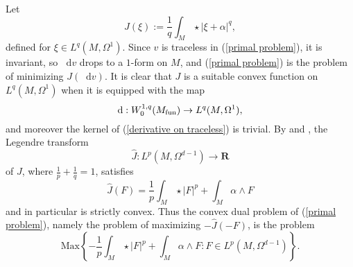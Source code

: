 \documentclass[reqno,11pt]{amsart}
\newcommand{\RR}{\mathbf{R}}
\newcommand*\dif{\mathop{}\!\mathrm{d}}
\newcommand{\Max}{\mathrm{Max}}
\newtheorem{lemma}[theorem]{Lemma}
\theoremstyle{definition}
\numberwithin{equation}{section}
\begin{document}
Let
$$J(\xi) := \frac{1}{q} \int_M \star|\xi + \alpha|^q,$$
defined for $\xi \in L^q(M, \Omega^1)$.
Since $v$ is traceless in (\ref{primal problem}), it is invariant, so $\dif v$ drops to a $1$-form on $M$, and (\ref{primal problem}) is the problem of minimizing $J(\dif v)$.
It is clear that $J$ is a suitable convex function on $L^q(M, \Omega^1)$ when it is equipped with the map
\begin{equation}\label{derivative on traceless}
\dif: W^{1, q}_0(M_{\rm fun}) \to L^q(M, \Omega^1),
\end{equation}
and moreover the kernel of (\ref{derivative on traceless}) is trivial.
By \cite[Chapter I, (4.9)]{Ekeland99} and \cite[Chapter I, Remark 4.1]{Ekeland99}, the Legendre transform
$$\hat J: L^p(M, \Omega^{d - 1}) \to \RR$$
of $J$, where $\frac{1}{p} + \frac{1}{q} = 1$, satisfies
\begin{equation}\label{Legendre transform}
\hat J(F) = \frac{1}{p} \int_M \star |F|^p + \int_M \alpha \wedge F
\end{equation}
and in particular is strictly convex.
Thus the convex dual problem of (\ref{primal problem}), namely the problem of maximizing $-\hat J(-F)$, is the problem
\begin{equation}\label{predual problem}
\Max\left\{- \frac{1}{p} \int_M \star |F|^p + \int_M \alpha \wedge F: F \in L^p(M, \Omega^{d - 1})\right\}.
\end{equation}

\end{document}
